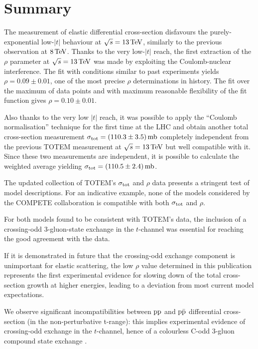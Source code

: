 \section{Summary}
\label{sec:summary}

The measurement of elastic differential cross-section disfavours the purely-exponential low-$|t|$ behaviour at $\sqrt s = 13\,{\rm TeV}$, similarly to the previous observation at $8\,{\rm TeV}$. Thanks to the very low-$|t|$ reach, the first extraction of the $\rho$ parameter at $\sqrt s = 13\,{\rm TeV}$ was made by exploiting the Coulomb-nuclear interference. The fit with conditions similar to past experiments yields $\rho = 0.09 \pm 0.01$, one of the most precise $\rho$ determinations in history. The fit over the maximum of data points and with maximum reasonable flexibility of the fit function gives $\rho = 0.10 \pm 0.01$.

Also thanks to the very low $|t|$ reach, it was possible to apply the ``Coulomb normalisation'' technique for the first time at the LHC and obtain another total cross-section measurement $\sigma_{\rm tot} = (110.3 \pm 3.5)\,{\rm mb}$ completely independent from the previous TOTEM measurement at $\sqrt s = 13\,{\rm TeV}$ \cite{totem-13tev-90m} but well compatible with it. Since these two measurements are independent, it is possible to calculate the weighted average yielding $\sigma_{\rm tot} = (110.5 \pm 2.4)\,{\rm mb}$.

The updated collection of TOTEM's $\sigma_{\rm tot}$ and $\rho$ data presents a stringent test of model descriptions. For an indicative example, none of the models considered by the COMPETE collaboration is compatible with both $\sigma_{\rm tot}$ and $\rho$.

For both models found to be consistent with TOTEM's data, the inclusion of a crossing-odd 3-gluon-state exchange in the $t$-channel was essential for reaching the good agreement with the data.

If it is demonstrated in future that the crossing-odd exchange component is unimportant for elastic scattering, the low $\rho$ value determined in this publication represents the first experimental evidence for slowing down of the total cross-section growth at higher energies, leading to a deviation from most current model expectations.

We observe significant incompatibilities between $\rm pp$ and $\rm p \bar p$ differential cross-section (in the non-perturbative t-range): this implies experimental evidence of crossing-odd exchange in the $t$-channel, hence of a colourless C-odd 3-gluon compound state exchange \cite{bartels-2000,bartels-2001}.
